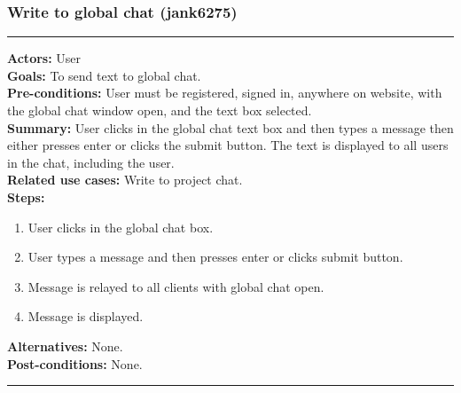 \documentclass[11pt]{report}
\begin{document}
\subsubsection{Write to global chat (jank6275)}
\vspace{2pt}
\hrule
\vspace{8pt}
 \textbf{Actors:} User \\ 
 \textbf{Goals:} To send text to global chat. \\
 \textbf{Pre-conditions:} User must be registered, signed in, anywhere on website, with the global chat window open, and the text box selected.  \\
 \textbf{Summary:} User clicks in the global chat text box and then types a message then either presses enter or clicks the submit button. The text is displayed to all users in the chat, including the user. \\ 
 \textbf{Related use cases:} Write to project chat. \\ 
 \textbf{Steps:} \begin{enumerate}
  \item User clicks in the global chat box.
  \item User types a message and then presses enter or clicks submit button.
  \item Message is relayed to all clients with global chat open.
  \item Message is displayed.
 \end{enumerate}
 \textbf{Alternatives:} None. \\
 \textbf{Post-conditions:} None. \\
 \vspace{8pt}
\hrule
\newpage
\end{document}
